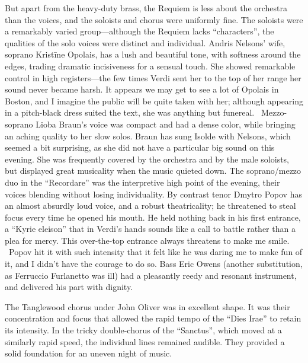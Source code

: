 But apart from the heavy-duty brass, the Requiem is less about the orchestra than the voices, and the soloists and chorus were uniformly fine. The soloists were a remarkably varied group—although the Requiem lacks “characters”, the qualities of the solo voices were distinct and individual. Andris Nelsons’ wife, soprano Kristīne Opolais, has a lush and beautiful tone, with softness around the edges, trading dramatic incisiveness for a sensual touch. She showed remarkable control in high registers—the few times Verdi sent her to the top of her range her sound never became harsh. It appears we may get to see a lot of Opolais in Boston, and I imagine the public will be quite taken with her; although appearing in a pitch-black dress suited the text, she was anything but funereal.  Mezzo-soprano Lioba Braun’s voice was compact and had a dense color, while bringing an aching quality to her slow solos. Braun has sung Isolde with Nelsons, which seemed a bit surprising, as she did not have a particular big sound on this evening. She was frequently covered by the orchestra and by the male soloists, but displayed great musicality when the music quieted down. The soprano/mezzo duo in the “Recordare” was the interpretive high point of the evening, their voices blending without losing individuality. By contrast tenor Dmytro Popov has an almost absurdly loud voice, and a robust theatricality; he threatened to steal focus every time he opened his mouth. He held nothing back in his first entrance, a “Kyrie eleison” that in Verdi’s hands sounds like a call to battle rather than a plea for mercy. This over-the-top entrance always threatens to make me smile.  Popov hit it with such intensity that it felt like he was daring me to make fun of it, and I didn’t have the courage to do so. Bass Eric Owens (another substitution, as Ferruccio Furlanetto was ill) had a pleasantly reedy and resonant instrument, and delivered his part with dignity.

The Tanglewood chorus under John Oliver was in excellent shape. It was their concentration and focus that allowed the rapid tempo of the “Dies Irae” to retain its intensity. In the tricky double-chorus of the “Sanctus”, which moved at a similarly rapid speed, the individual lines remained audible. They provided a solid foundation for an uneven night of music.
